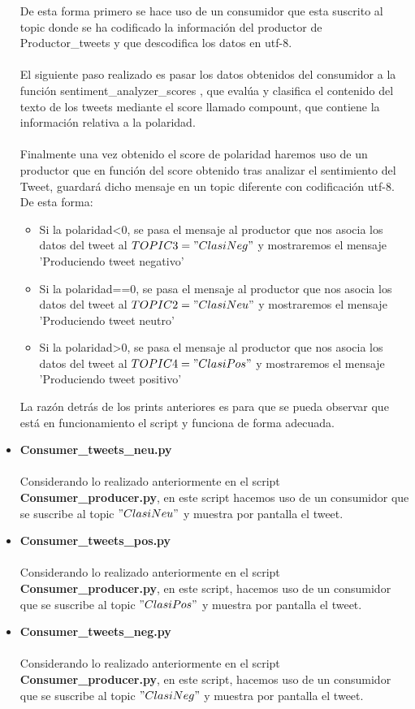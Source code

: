 \documentclass[12pt, a4paper, twoside]{article}
\begin{document}
\begin{itemize}
De esta forma primero se hace uso de un consumidor que esta suscrito al topic donde se ha codificado la información del productor de  Productor\_tweets y que descodifica los datos en utf-8.\\\\
El siguiente paso realizado es pasar los datos obtenidos del consumidor a la función sentiment\_analyzer\_scores , que evalúa y clasifica el contenido del texto de los tweets mediante el score llamado compount, que contiene la información relativa a la polaridad.\\\\
Finalmente una vez obtenido el score de polaridad haremos uso de un productor que en función del score obtenido tras analizar el sentimiento del Tweet, guardará dicho mensaje en un topic diferente con codificación utf-8.\newpage
 De esta forma:
\begin{itemize}
\item Si la polaridad\textless0, se pasa el mensaje al productor que nos asocia los datos del tweet al $TOPIC3 = "ClasiNeg"$ y mostraremos el mensaje 'Produciendo tweet negativo'
\item Si la polaridad==0, se pasa el mensaje al productor que nos asocia los datos del tweet al $TOPIC2 = "ClasiNeu"$ y mostraremos el mensaje 'Produciendo tweet neutro'
\item Si la polaridad\textgreater0, se pasa el mensaje al productor que nos asocia los datos del tweet al $TOPIC4 = "ClasiPos"$ y mostraremos el mensaje 'Produciendo tweet positivo'
\end{itemize}

La razón detrás de los prints anteriores es para que se pueda observar que está en funcionamiento el script y funciona de forma adecuada.

\item \textbf{Consumer\_tweets\_neu.py}\\\\
Considerando lo realizado anteriormente en el script \textbf{Consumer\_producer.py},
en este script hacemos uso de un consumidor que se suscribe al topic $"ClasiNeu"$ y muestra por pantalla el tweet.
\item \textbf{Consumer\_tweets\_pos.py}\\\\
Considerando lo realizado anteriormente en el script \textbf{Consumer\_producer.py},
en este script, hacemos uso de un consumidor que se suscribe al topic $"ClasiPos"$ y muestra por pantalla el tweet.
\item \textbf{Consumer\_tweets\_neg.py}\\\\
Considerando lo realizado anteriormente en el script \textbf{Consumer\_producer.py},
en este script, hacemos uso de un consumidor que se suscribe al topic $"ClasiNeg"$ y muestra por pantalla el tweet.
\end{itemize}
\newpage
\end{document}
